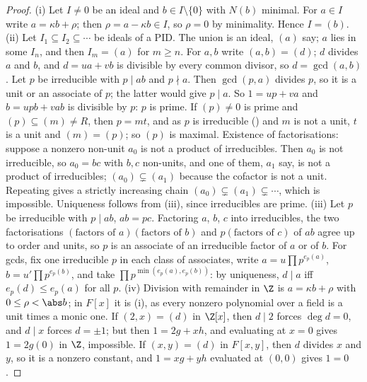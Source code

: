 \begin{proof}
(i) Let $I\ne0$ be an ideal and $b\in I\setminus\{0\}$ with $N(b)$ minimal. For $a\in I$ write $a=\kappa b+\rho$; then $\rho=a-\kappa b\in I$, so $\rho=0$
by minimality. Hence $I=(b)$.
(ii) Let $I_1\subseteq I_2\subseteq\cdots$ be ideals of a PID. The union is an ideal, $(a)$ say; $a$ lies in some $I_n$, and then $I_m=(a)$ for
$m\ge n$. For $a,b$ write $(a,b)=(d)$; $d$ divides $a$ and $b$, and $d=ua+vb$ is divisible by every common divisor, so $d=\gcd(a,b)$.
Let $p$ be irreducible with $p\mid ab$ and $p\nmid a$. Then $\gcd(p,a)$ divides $p$, so it is a unit or an associate of $p$; the latter
would give $p\mid a$. So $1=up+va$ and $b=upb+vab$ is divisible by $p$: $p$ is prime. If $(p)\ne0$ is prime and $(p)\subseteq(m)\ne R$,
then $p=mt$, and as $p$ is irreducible () and $m$ is not a unit, $t$ is a unit and $(m)=(p)$; so $(p)$
is maximal. Existence of factorisations: suppose a nonzero non-unit $a_0$ is not a product of irreducibles. Then $a_0$ is not
irreducible, so $a_0=bc$ with $b,c$ non-units, and one of them, $a_1$ say, is not a product of irreducibles; $(a_0)\subsetneq(a_1)$
because the cofactor is not a unit. Repeating gives a strictly increasing chain $(a_0)\subsetneq(a_1)\subsetneq\cdots$, which is
impossible. Uniqueness follows from (iii), since irreducibles are prime.
(iii) Let $p$ be irreducible with $p\mid ab$, $ab=pc$. Factoring $a$, $b$, $c$ into irreducibles, the two factorisations
$(\text{factors of }a)(\text{factors of }b)$ and $p(\text{factors of }c)$ of $ab$ agree up to order and units, so $p$ is an associate of an
irreducible factor of $a$ or of $b$. For gcds, fix one irreducible $p$ in each class of associates, write
$a=u\prod p^{e_p(a)}$, $b=u'\prod p^{e_p(b)}$, and take $\prod p^{\min(e_p(a),e_p(b))}$: by uniqueness, $d\mid a$ iff $e_p(d)\le e_p(a)$ for all $p$.
(iv) Division with remainder in $\Z$ is $a=\kappa b+\rho$ with $0\le\rho<\abs b$; in $F[x]$ it is (i), as every
nonzero polynomial over a field is a unit times a monic one. If $(2,x)=(d)$ in $\Z[x]$, then $d\mid2$ forces $\deg d=0$, and $d\mid x$
forces $d=\pm1$; but then $1=2g+xh$, and evaluating at $x=0$ gives $1=2g(0)$ in $\Z$, impossible. If $(x,y)=(d)$ in $F[x,y]$, then $d$
divides $x$ and $y$, so it is a nonzero constant, and $1=xg+yh$ evaluated at $(0,0)$ gives $1=0$.
\end{proof}

